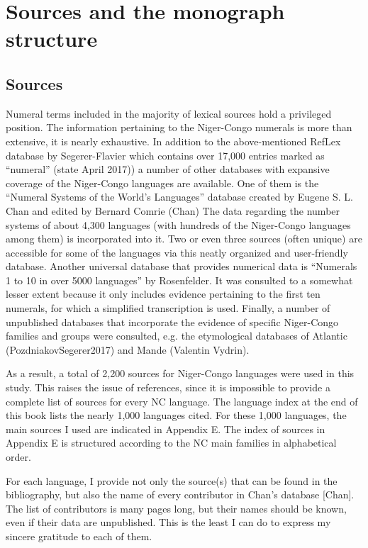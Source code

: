\section{Sources and the monograph structure}

\subsection{Sources}
Numeral terms included in the majority of lexical sources hold a privileged position. The information pertaining to the Niger-Congo numerals is more than extensive, it is nearly exhaustive. In addition to the above-mentioned RefLex database by Segerer-Flavier which contains over 17,000 entries marked as “numeral” (state  {April 2017)}) a number of other databases with expansive coverage of the Niger-Congo languages are available. One of them is the “Numeral Systems of the World's Languages” database created by Eugene S. L. Chan and edited by Bernard Comrie (Chan) The data regarding the number systems of about 4,300 languages (with hundreds of the Niger-Congo languages among them) is incorporated into it. Two or even three sources (often unique) are accessible for some of the languages via this neatly organized and user-friendly database. Another universal database that provides numerical data is “Numerals 1 to 10 in over 5000 languages” by Rosenfelder. It was consulted to a somewhat lesser extent because it only includes evidence pertaining to the first ten numerals, for which a simplified transcription is used. Finally, a number of unpublished databases that incorporate the evidence of specific Niger-Congo families and groups  were consulted, e.g. the etymological databases of Atlantic (PozdniakovSegerer2017) and Mande (Valentin Vydrin). 

As a result, a total of 2,200 sources for Niger-Congo languages were used in this study. This raises the issue of references, since it is impossible to provide a complete list of sources for every NC language. The language index at the end of this book lists the nearly 1,000 languages cited. For these 1,000 languages, the main sources I used are indicated in Appendix E. The index of sources in Appendix E is structured according to the NC main families in alphabetical order. 

For each language, I provide not only the source(s) that can be found in the bibliography, but also the name of every contributor in Chan’s database [Chan]. The list of contributors is many pages long, but their names should be known, even if their data are unpublished. This is the least I can do to express my sincere gratitude to each of them.

